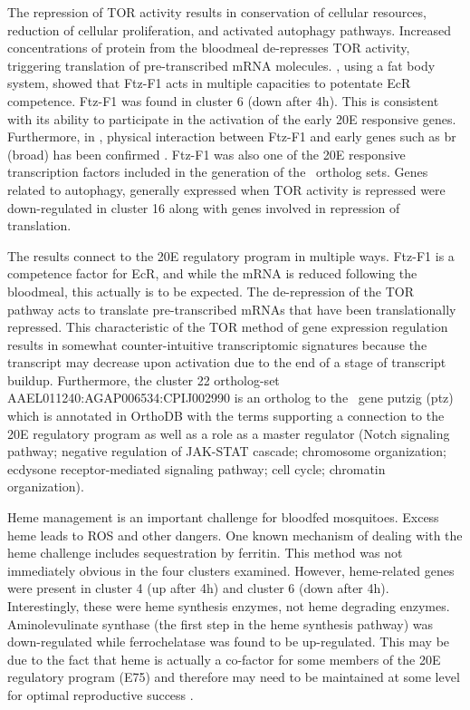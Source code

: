 The repression of \gls{TOR} activity results in conservation of cellular resources, reduction of cellular proliferation, and activated autophagy pathways.
%
Increased concentrations of protein from the bloodmeal de-represses \gls{TOR} activity, triggering translation of pre-transcribed mRNA molecules.
%
\citet{Zhu2006}, using a fat body system, showed that Ftz-F1 acts in multiple capacities to potentate \gls{EcR} competence.
%
Ftz-F1 was found in cluster 6 (down after 4h).
%
This is consistent with its ability to participate in the activation of the early \gls{20E} responsive genes.
%
Furthermore, in \Dm, physical interaction between Ftz-F1 and early genes such as br (broad) has been confirmed \cite{Yamada2000}.
%
Ftz-F1 was also one of the \gls{20E} responsive transcription factors included in the generation of the \PTCIe\ ortholog sets.
%
Genes related to autophagy, generally expressed when \gls{TOR} activity is repressed were down-regulated in cluster 16 along with genes involved in repression of translation.

The results connect to the \gls{20E} regulatory program in multiple ways.
%
Ftz-F1 is a competence factor for \gls{EcR}, and while the mRNA is reduced following the bloodmeal, this actually is to be expected.
%
The de-repression of the \gls{TOR} pathway acts to translate pre-transcribed mRNAs that have been translationally repressed.
%
This characteristic of the \gls{TOR} method of gene expression regulation results in somewhat counter-intuitive transcriptomic signatures because the transcript may decrease upon activation due to the end of a stage of transcript buildup.
%
Furthermore, the cluster 22 ortholog-set AAEL011240:AGAP006534:CPIJ002990 is an ortholog to the \Dm\ gene putzig (ptz) which is annotated in OrthoDB with the terms supporting a connection to the \gls{20E} regulatory program as well as a role as a master regulator (Notch signaling pathway; negative regulation of JAK-STAT cascade; chromosome organization; ecdysone receptor-mediated signaling pathway; cell cycle; chromatin organization).

Heme management is an important challenge for bloodfed mosquitoes.
%
Excess heme leads to \gls{ROS} and other dangers.
%
One known mechanism of dealing with the heme challenge includes sequestration by ferritin.
%
This method was not immediately obvious in the four clusters examined.
%
However, heme-related genes were present in cluster 4 (up after 4h) and cluster 6 (down after 4h).
%
Interestingly, these were heme synthesis enzymes, not heme degrading enzymes.
%
Aminolevulinate synthase (the first step in the heme synthesis pathway) was down-regulated while ferrochelatase was found to be up-regulated.
%
This may be due to the fact that heme is actually a co-factor for some members of the \gls{20E} regulatory program (E75) and therefore may need to be maintained at some level for optimal reproductive success \cite{Reinking2005}.



